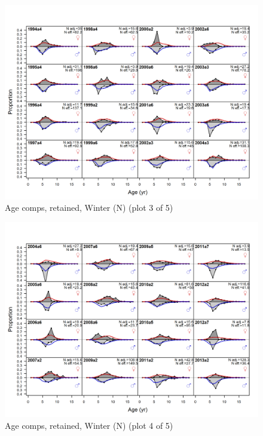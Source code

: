 \documentclass[12pt,]{article}
\begin{document}
\begin{figure}
\centering
\includegraphics{r4ss/plots_mod1/comp_agefit_flt1mkt2_page3.png}
\caption{Age comps, retained, Winter (N) (plot 3 of 5)
\label{fig:age_fits}}
\end{figure}

\begin{figure}
\centering
\includegraphics{r4ss/plots_mod1/comp_agefit_flt1mkt2_page4.png}
\caption{Age comps, retained, Winter (N) (plot 4 of 5)
\label{fig:age_fits}}
\end{figure}
\end{document}
